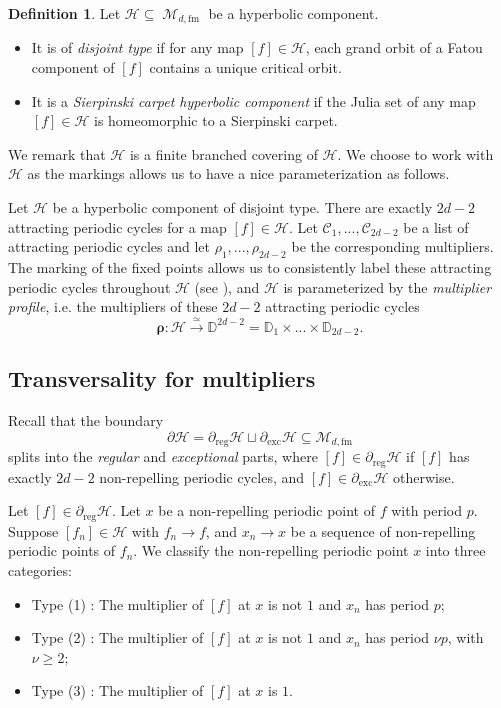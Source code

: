 \documentclass[11pt, reqno]{amsart}
\makeatletter
\newcommand{\setword}[2]{
  \phantomsection
  #1\def\@currentlabel{\unexpanded{#1}}\label{#2}%
}
\numberwithin{equation}{section}
\theoremstyle{plain}
\theoremstyle{theorem}
\theoremstyle{plain}
\theoremstyle{definition}
\newtheorem{defn}[theorem]{Definition}
\newcommand{\D}{\mathbb{D}}
\newcommand{\fm}{\text{fm}}
\DeclareMathOperator{\M}{\mathcal{M}}
\numberwithin{figure}{section}
\makeatother
\begin{document}
\begin{defn}
\label{dfn:HH_fm}
Let $\mathcal{H} \subseteq \M_{d,\fm}$ be a hyperbolic component.
\begin{itemize}
    \item It is of {\em disjoint type} if for any map $[f] \in \mathcal{H}$, each grand orbit of a Fatou component of $[f]$ contains a unique critical orbit. 
    \item It is a {\em Sierpinski carpet hyperbolic component} if the Julia set of any map $[f] \in \mathcal{H}$ is homeomorphic to a Sierpinski carpet.
\end{itemize}
\end{defn}

We remark that $\mathcal{H}$ is a finite branched covering of $\mathcal{H}$.
We choose to work with $\mathcal{H}$ as the markings allows us to have a nice parameterization as follows.

Let $\mathcal{H}$ be a hyperbolic component of disjoint type.
There are exactly $2d-2$ attracting periodic cycles for a map $[f] \in \mathcal{H}$.
Let $\mathcal{C}_1, ..., \mathcal{C}_{2d-2}$ be a list of attracting periodic cycles and let $\rho_1,..., \rho_{2d-2}$ be the corresponding multipliers.
The marking of the fixed points allows us to consistently label these attracting periodic cycles throughout $\mathcal{H}$ (see \cite[Theorem 9.3]{Milnor12}), and $\mathcal{H}$ is parameterized by the {\em multiplier profile}, i.e. the multipliers of these $2d-2$ attracting periodic cycles
$$
\boldsymbol{\rho}: \mathcal{H} \overset{\simeq}{\longrightarrow} \D^{2d-2} =  \D_1 \times ... \times \D_{2d-2}.
$$

\subsection{Transversality for multipliers}
Recall that the boundary 
$$
\partial \mathcal{H} = \partial_{\operatorname{reg}}\mathcal{H} \sqcup \partial_{\operatorname{exc}}\mathcal{H}\subseteq \mathcal{M}_{d, \fm}
$$ 
splits into the \emph{regular} and \emph{exceptional} parts, where $[f] \in \partial_{\operatorname{reg}}\mathcal{H}$ if $[f]$ has exactly $2d-2$ non-repelling periodic cycles, and $[f] \in \partial_{\operatorname{exc}}\mathcal{H}$ otherwise.

Let $[f] \in \partial_{\operatorname{reg}}\mathcal{H}$.
Let $x$ be a non-repelling periodic point of $f$ with period $p$.
Suppose $[f_n] \in \mathcal{H}$ with $f_n \to f$, and $x_n \to x$ be a sequence of non-repelling periodic points of $f_n$.
We classify the non-repelling periodic point $x$ into three categories:
\begin{itemize}
    \item Type\setword{(1)}{Type:1}: The multiplier of $[f]$ at $x$ is not $1$ and $x_n$ has period $p$;
    \item Type\setword{(2)}{Type:2}: The multiplier of $[f]$ at $x$ is not $1$ and $x_n$ has period $\nu p$, with $\nu \geq 2$;
    \item Type\setword{(3)}{Type:3}: The multiplier of $[f]$ at $x$ is $1$.
\end{itemize}
\end{document}
